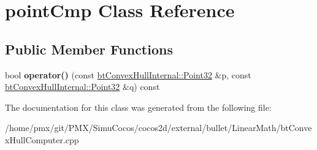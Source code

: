\hypertarget{classpointCmp}{}\section{point\+Cmp Class Reference}
\label{classpointCmp}
\subsection*{Public Member Functions}
\begin{DoxyCompactItemize}
\item 
\mbox{\label{classpointCmp_a74e96952eeb8bd0384461be73ca8f64b}} 
bool {\bfseries operator()} (const \hyperlink{classbtConvexHullInternal_1_1Point32}{bt\+Convex\+Hull\+Internal\+::\+Point32} \&p, const \hyperlink{classbtConvexHullInternal_1_1Point32}{bt\+Convex\+Hull\+Internal\+::\+Point32} \&q) const
\end{DoxyCompactItemize}


The documentation for this class was generated from the following file\+:\begin{DoxyCompactItemize}
\item 
/home/pmx/git/\+P\+M\+X/\+Simu\+Cocos/cocos2d/external/bullet/\+Linear\+Math/bt\+Convex\+Hull\+Computer.\+cpp\end{DoxyCompactItemize}
